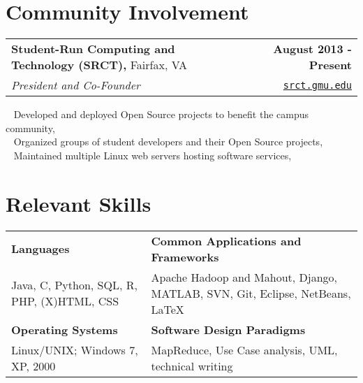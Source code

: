 \documentclass[letterpaper]{article}
\newcommand{\detail}{\indent\textbullet ~ }
\begin{document}
%


  \section{Community Involvement}
  \noindent
  \begin{tabularx}{\textwidth}{@{}X r@{}}
    \textbf{Student-Run Computing and Technology (SRCT),} Fairfax, VA & \textbf{August 2013 - Present} \\
    \emph{President and Co-Founder} & \texttt{\href{srct.gmu.edu}{srct.gmu.edu}} \\[0.2cm]
  \end{tabularx}

  \detail Developed and deployed Open Source projects to benefit the campus community,\\
  \detail Organized groups of student developers and their Open Source projects,\\
  \detail Maintained multiple Linux web servers hosting software services,\\


  \section{Relevant Skills}
  \noindent
  \begin{tabularx}{\textwidth}{@{}X X@{}}
    \textbf{Languages}                                    &  \textbf{Common Applications and Frameworks} \\
    Java, C, Python, SQL, R, PHP, (X)HTML, CSS          &  Apache Hadoop and Mahout, Django, MATLAB, SVN, Git, Eclipse, NetBeans, \LaTeX \\[0.2cm]
    \textbf{Operating Systems}                            &  \textbf{Software Design Paradigms} \\
    Linux/UNIX; Windows 7, XP, 2000                       &  MapReduce, Use Case analysis, UML, technical writing
  \end{tabularx}


\end{document}
